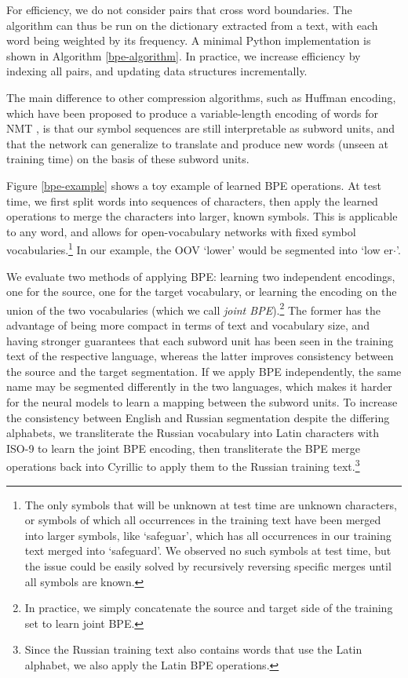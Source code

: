 For efficiency, we do not consider pairs that cross word boundaries. The algorithm can thus be run on the dictionary extracted from a text, with each word being weighted by its frequency. A minimal Python implementation is shown in Algorithm \ref{bpe-algorithm}.
In practice, we increase efficiency by indexing all pairs, and updating data structures incrementally.

The main difference to other compression algorithms, such as Huffman encoding, which have been proposed to produce a variable-length encoding of words for NMT \cite{chitnis15}, is that our symbol sequences are still interpretable as subword units, and that the network can generalize to translate and produce new words (unseen at training time) on the basis of these subword units.

Figure \ref{bpe-example} shows a toy example of learned BPE operations. At test time, we first split words into sequences of characters, then apply the learned operations to merge the characters into larger, known symbols. This is applicable to any word, and allows for open-vocabulary networks with fixed symbol vocabularies.\footnote{The only symbols that will be unknown at test time are unknown characters, or symbols of which all occurrences in the training text have been merged into larger symbols, like `safeguar', which has all occurrences in our training text merged into `safeguard'. We observed no such symbols at test time, but the issue could be easily solved by recursively reversing specific merges until all symbols are known.} In our example, the OOV `lower' would be segmented into `low er$\cdot$'.

We evaluate two methods of applying BPE: learning two independent encodings, one for the source, one for the target vocabulary, or learning the encoding on the union of the two vocabularies (which we call \emph{joint BPE}).\footnote{In practice, we simply concatenate the source and target side of the training set to learn joint BPE.} The former has the advantage of being more compact in terms of text and vocabulary size, and having stronger guarantees that each subword unit has been seen in the training text of the respective language, whereas the latter improves consistency between the source and the target segmentation. If we apply BPE independently, the same name may be segmented differently in the two languages, which makes it harder for the neural models to learn a mapping between the subword units. To increase the consistency between English and Russian segmentation despite the differing alphabets, we transliterate the Russian vocabulary into Latin characters with ISO-9 to learn the joint BPE encoding, then transliterate the BPE merge operations back into Cyrillic to apply them to the Russian training text.\footnote{Since the Russian training text also contains words that use the Latin alphabet, we also apply the Latin BPE operations.}

